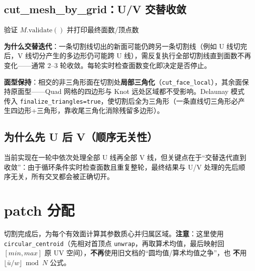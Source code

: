 \documentclass[12pt,a4paper]{article}
\begin{document}
\subsection{cut\_mesh\_by\_grid：U/V 交替收敛}

\begin{algorithm}[H]

验证 $M.\text{validate}()$ 并打印最终面数/顶点数\;
\end{algorithm}

\textbf{为什么交替迭代}：一条切割线切出的新面可能仍跨另一条切割线（例如 U 线切完后，V 线切分产生的多边形仍可能跨 U 线），需反复执行全部切割线直到面数不再变化——通常 2–3 轮收敛。每轮实时检查面数变化即决定是否停止。

\textbf{面型保持}：相交的非三角形面在切割处\textbf{局部三角化}（\texttt{cut\_face\_local}），其余面保持原面型——Quad 网格的四边形与 Knot 远处区域都不受影响。Delaunay 模式传入 \texttt{finalize\_triangles=true}，使切割后全为三角形（一条直线切三角形必产生四边形+三角形，靠收尾三角化消除残留多边形）。

\subsection{为什么先 U 后 V（顺序无关性）}

当前实现在一轮中依次处理全部 U 线再全部 V 线，但关键点在于“交替迭代直到收敛”：由于循环条件实时检查面数且重复整轮，最终结果与 U/V 处理的先后顺序无关，所有交叉都会被正确切开。

\section{patch 分配}

切割完成后，为每个有效面计算其参数质心并归属区域。\textbf{注意}：这里使用
\texttt{circular\_centroid}（先相对首顶点 \texttt{unwrap}，再取算术均值，最后映射回
$[min,max]$ 原 UV 空间），\textbf{不再}使用旧文档的“圆均值/算术均值之争”，也
\textbf{不}用 $\lfloor\bar u/w\rfloor\bmod N$ 公式。
\end{document}
